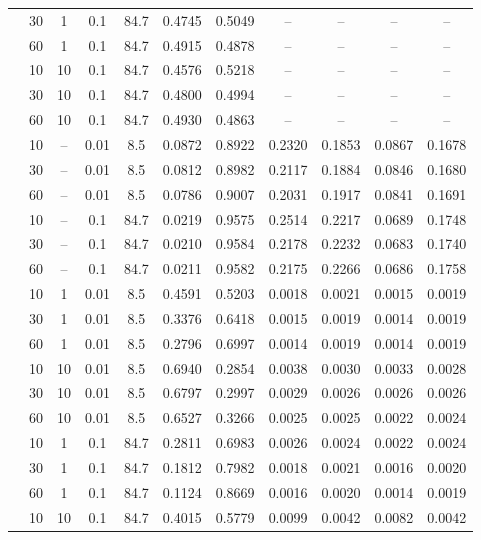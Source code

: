 \begin{longtable}{@{}l c c c c c c c c c c@{}}
	& 30 & 1 & 0.1 & 84.7 & 0.4745 & 0.5049 & -- & -- & -- & -- \\
	& 60 & 1 & 0.1 & 84.7 & 0.4915 & 0.4878 & -- & -- & -- & -- \\
	& 10 & 10 & 0.1 & 84.7 & 0.4576 & 0.5218 & -- & -- & -- & -- \\
	& 30 & 10 & 0.1 & 84.7 & 0.4800 & 0.4994 & -- & -- & -- & -- \\
	& 60 & 10 & 0.1 & 84.7 & 0.4930 & 0.4863 & -- & -- & -- & -- \\
	\arrayrulecolor{gray!60}\midrule\arrayrulecolor{black}
	\multirow{6}{*}{\textbf{FLTrust + TopK}} & 10 & -- & 0.01 & 8.5 & 0.0872 & 0.8922 & 0.2320 & 0.1853 & 0.0867 & 0.1678 \\
	& 30 & -- & 0.01 & 8.5 & 0.0812 & 0.8982 & 0.2117 & 0.1884 & 0.0846 & 0.1680 \\
	& 60 & -- & 0.01 & 8.5 & 0.0786 & 0.9007 & 0.2031 & 0.1917 & 0.0841 & 0.1691 \\
	& 10 & -- & 0.1 & 84.7 & 0.0219 & 0.9575 & 0.2514 & 0.2217 & 0.0689 & 0.1748 \\
	& 30 & -- & 0.1 & 84.7 & 0.0210 & 0.9584 & 0.2178 & 0.2232 & 0.0683 & 0.1740 \\
	& 60 & -- & 0.1 & 84.7 & 0.0211 & 0.9582 & 0.2175 & 0.2266 & 0.0686 & 0.1758 \\
	\arrayrulecolor{gray!60}\midrule\arrayrulecolor{black}
	\multirow{12}{*}{\textbf{ALL}} & 10 & 1 & 0.01 & 8.5 & 0.4591 & 0.5203 & 0.0018 & 0.0021 & 0.0015 & 0.0019 \\
	& 30 & 1 & 0.01 & 8.5 & 0.3376 & 0.6418 & 0.0015 & 0.0019 & 0.0014 & 0.0019 \\
	& 60 & 1 & 0.01 & 8.5 & 0.2796 & 0.6997 & 0.0014 & 0.0019 & 0.0014 & 0.0019 \\
	& 10 & 10 & 0.01 & 8.5 & 0.6940 & 0.2854 & 0.0038 & 0.0030 & 0.0033 & 0.0028 \\
	& 30 & 10 & 0.01 & 8.5 & 0.6797 & 0.2997 & 0.0029 & 0.0026 & 0.0026 & 0.0026 \\
	& 60 & 10 & 0.01 & 8.5 & 0.6527 & 0.3266 & 0.0025 & 0.0025 & 0.0022 & 0.0024 \\
	& 10 & 1 & 0.1 & 84.7 & 0.2811 & 0.6983 & 0.0026 & 0.0024 & 0.0022 & 0.0024 \\
	& 30 & 1 & 0.1 & 84.7 & 0.1812 & 0.7982 & 0.0018 & 0.0021 & 0.0016 & 0.0020 \\
	& 60 & 1 & 0.1 & 84.7 & 0.1124 & 0.8669 & 0.0016 & 0.0020 & 0.0014 & 0.0019 \\
	& 10 & 10 & 0.1 & 84.7 & 0.4015 & 0.5779 & 0.0099 & 0.0042 & 0.0082 & 0.0042 \\

\end{longtable}

